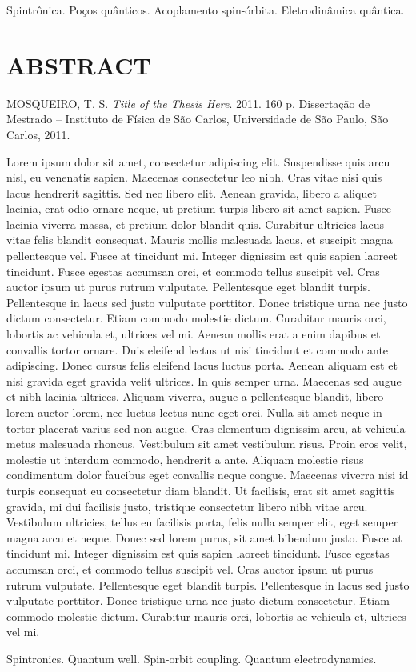 \begin{palavraschave}
	Spintrônica. Poços quânticos. Acoplamento spin-órbita. Eletrodinâmica quântica.
\end{palavraschave}

\chapter*{ABSTRACT}

\hspace{-0.9cm} MOSQUEIRO, T. S. \textit{Title of the Thesis Here}. 2011. 160 p. Dissertação de Mestrado -- Instituto de Física de São Carlos, Universidade de São Paulo, São Carlos, 2011.

\begin{resumo}
	Lorem ipsum dolor sit amet, consectetur adipiscing elit. Suspendisse quis arcu nisl, eu venenatis sapien. Maecenas consectetur leo nibh. Cras vitae nisi quis lacus hendrerit sagittis. Sed nec libero elit. Aenean gravida, libero a aliquet lacinia, erat odio ornare neque, ut pretium turpis libero sit amet sapien. Fusce lacinia viverra massa, et pretium dolor blandit quis. Curabitur ultricies lacus vitae felis blandit consequat. Mauris mollis malesuada lacus, et suscipit magna pellentesque vel. Fusce at tincidunt mi. Integer dignissim est quis sapien laoreet tincidunt. Fusce egestas accumsan orci, et commodo tellus suscipit vel. Cras auctor ipsum ut purus rutrum vulputate. Pellentesque eget blandit turpis. Pellentesque in lacus sed justo vulputate porttitor. Donec tristique urna nec justo dictum consectetur. Etiam commodo molestie dictum. Curabitur mauris orci, lobortis ac vehicula et, ultrices vel mi. Aenean mollis erat a enim dapibus et convallis tortor ornare. Duis eleifend lectus ut nisi tincidunt et commodo ante adipiscing. Donec cursus felis eleifend lacus luctus porta. Aenean aliquam est et nisi gravida eget gravida velit ultrices. In quis semper urna. Maecenas sed augue et nibh lacinia ultrices. Aliquam viverra, augue a pellentesque blandit, libero lorem auctor lorem, nec luctus lectus nunc eget orci. Nulla sit amet neque in tortor placerat varius sed non augue. Cras elementum dignissim arcu, at vehicula metus malesuada rhoncus. Vestibulum sit amet vestibulum risus. Proin eros velit, molestie ut interdum commodo, hendrerit a ante. Aliquam molestie risus condimentum dolor faucibus eget convallis neque congue. Maecenas viverra nisi id turpis consequat eu consectetur diam blandit. Ut facilisis, erat sit amet sagittis gravida, mi dui facilisis justo, tristique consectetur libero nibh vitae arcu. Vestibulum ultricies, tellus eu facilisis porta, felis nulla semper elit, eget semper magna arcu et neque. Donec sed lorem purus, sit amet bibendum justo. Fusce at tincidunt mi. Integer dignissim est quis sapien laoreet tincidunt. Fusce egestas accumsan orci, et commodo tellus suscipit vel. Cras auctor ipsum ut purus rutrum vulputate. Pellentesque eget blandit turpis. Pellentesque in lacus sed justo vulputate porttitor. Donec tristique urna nec justo dictum consectetur. Etiam commodo molestie dictum. Curabitur mauris orci, lobortis ac vehicula et, ultrices vel mi.
\end{resumo}

\begin{keywords}
	Spintronics. Quantum well. Spin-orbit coupling. Quantum electrodynamics.
\end{keywords}